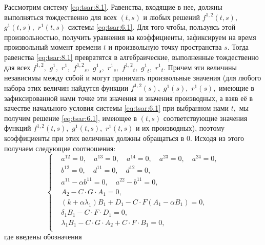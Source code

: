 Рассмотрим систему \eqref{eq:tsar:8.1}. Равенства, входящие в нее, 
должны выполняться тождественно для всех $(t,s)$ и любых решений
${f^{1,2}}(t,s),$ $g^{1}(t,s),$ $r^{1}(t,s)$ системы \eqref{eq:tsar:6.1}. 
Для того чтобы, пользуясь 
этой произвольностью, получить уравнения на коэффициенты,
зафиксируем на время произвольный момент времени $t$ и
произвольную точку пространства $s.$ Тогда равенства
\eqref{eq:tsar:8.1} превратятся в алгебраические, выполненные
тождественно для всех
${f^{1,2}},$ ${g^{1}},$ ${r^{1}},$ 
${f^{1,2}}_s,$ ${g^{1}}_s,$ ${r^{1}}_s,$ 
${f^{1,2}}_t,$ ${g^{1}}_t,$ ${r^{1}}_t.$ Причем эти
величины независимы между собой и могут принимать произвольные значения (для
любого набора этих величин найдутся функции $f^{1,2}(s),$ $g^{1}(s),$ $r^{1}(s),$
имеющие в зафиксированной нами точке эти значения и значения
производных, а взяв её в качестве начального условия системы
\eqref{eq:tsar:6.1} при выбранном нами $t,$ мы получим решение
\eqref{eq:tsar:6.1}, имеющее в $(t,s)$ соответствующие значения функций
$f^{1,2}(t,s),$ $g^{1}(t,s),$ $r^{1}(t,s)$ и их производных), поэтому коэффициенты при этих
величинах должны обращаться в 0. Исходя из этого получаем
следующие соотношения:
\begin{equation}
\left\{
\begin{aligned}
&a^{12} =0, \quad
 a^{13} =0, \quad
 a^{14} =0, \quad
 a^{23} =0, \quad
 a^{24} =0, \\
&b^{12} =0, \quad
 d^{11} =0, \quad
 d^{12} =0, \quad
\\&
  a^{11} - \alpha b^{11} =0,\quad
  a^{22} - b^{11} =0, \\
& A_2 - C \cdot G \cdot A_1 = 0,\\
& \left( k + \alpha \lambda_1 \right) B_1 + D_1 - C \cdot F \left( A_1 -\alpha B_1 \right) = 0,\\
& \delta_1 B_1- C \cdot F \cdot D_1 =0,\\ 
& \lambda_1 B_1 - C \cdot G \cdot A_2 + C \cdot F \cdot B_1 =0,\\
\end{aligned}
\right.
\label{eq:tsar:5_1.1}
\end{equation}
где введены обозначения
